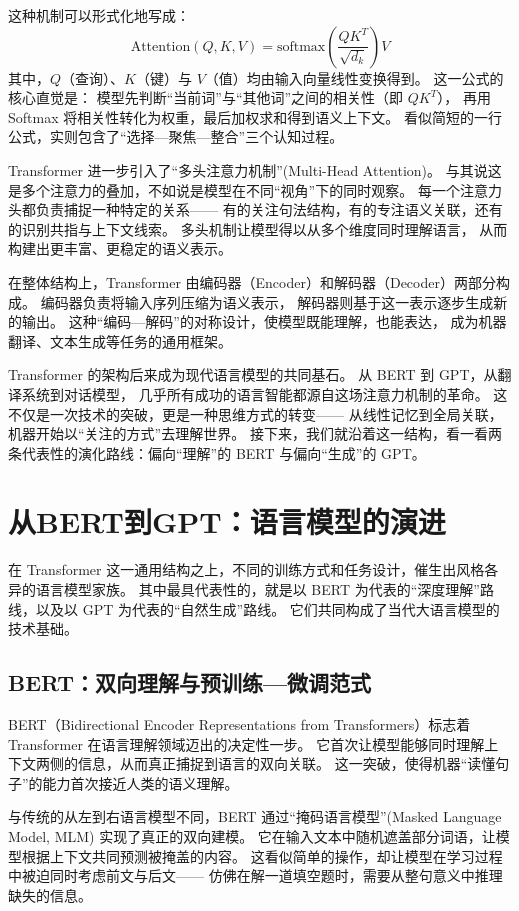 这种机制可以形式化地写成：  
\[
\text{Attention}(Q,K,V)=\text{softmax}\left(\frac{QK^T}{\sqrt{d_k}}\right)V
\]  
其中，$Q$（查询）、$K$（键）与 $V$（值）均由输入向量线性变换得到。  
这一公式的核心直觉是：  
模型先判断“当前词”与“其他词”之间的相关性（即 $QK^T$），  
再用 Softmax 将相关性转化为权重，最后加权求和得到语义上下文。  
看似简短的一行公式，实则包含了“选择—聚焦—整合”三个认知过程。  

Transformer 进一步引入了“多头注意力机制”(Multi-Head Attention)。  
与其说这是多个注意力的叠加，不如说是模型在不同“视角”下的同时观察。  
每一个注意力头都负责捕捉一种特定的关系——  
有的关注句法结构，有的专注语义关联，还有的识别共指与上下文线索。  
多头机制让模型得以从多个维度同时理解语言，  
从而构建出更丰富、更稳定的语义表示。  

在整体结构上，Transformer 由编码器（Encoder）和解码器（Decoder）两部分构成。  
编码器负责将输入序列压缩为语义表示，  
解码器则基于这一表示逐步生成新的输出。  
这种“编码—解码”的对称设计，使模型既能理解，也能表达，  
成为机器翻译、文本生成等任务的通用框架。  

Transformer 的架构后来成为现代语言模型的共同基石。  
从 BERT 到 GPT，从翻译系统到对话模型，  
几乎所有成功的语言智能都源自这场注意力机制的革命。  
这不仅是一次技术的突破，更是一种思维方式的转变——  
从线性记忆到全局关联，机器开始以“关注的方式”去理解世界。  
接下来，我们就沿着这一结构，看一看两条代表性的演化路线：偏向“理解”的 BERT 与偏向“生成”的 GPT。

\section{从BERT到GPT：语言模型的演进}
在 Transformer 这一通用结构之上，不同的训练方式和任务设计，催生出风格各异的语言模型家族。
其中最具代表性的，就是以 BERT 为代表的“深度理解”路线，以及以 GPT 为代表的“自然生成”路线。
它们共同构成了当代大语言模型的技术基础。

\subsection{BERT：双向理解与预训练—微调范式}

BERT（Bidirectional Encoder Representations from Transformers）标志着 Transformer 在语言理解领域迈出的决定性一步。  
它首次让模型能够同时理解上下文两侧的信息，从而真正捕捉到语言的双向关联。  
这一突破，使得机器“读懂句子”的能力首次接近人类的语义理解。  

与传统的从左到右语言模型不同，BERT 通过“掩码语言模型”(Masked Language Model, MLM) 实现了真正的双向建模。  
它在输入文本中随机遮盖部分词语，让模型根据上下文共同预测被掩盖的内容。  
这看似简单的操作，却让模型在学习过程中被迫同时考虑前文与后文——  
仿佛在解一道填空题时，需要从整句意义中推理缺失的信息。  

